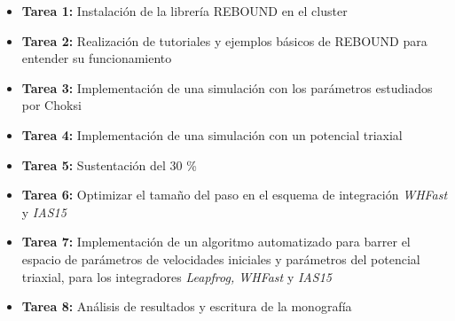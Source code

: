 	\begin{itemize}
		\item \textbf{Tarea 1:} Instalaci\'on de la librer\'ia REBOUND en el cluster
		\item \textbf{Tarea 2:} Realización de tutoriales y ejemplos básicos de REBOUND para entender su funcionamiento
		\item \textbf{Tarea 3:} Implementación de una simulación con los par\'ametros estudiados por Choksi \cite{choksi2017recoiling}
		\item \textbf{Tarea 4:} Implementaci\'on de una simulaci\'on con un potencial triaxial
		\item \textbf{Tarea 5:} Sustentaci\'on del 30 \%
		\item \textbf{Tarea 6:} Optimizar el tama\~no del paso en el esquema de integraci\'on \textit{WHFast} y \textit{IAS15}
		\item \textbf{Tarea 7:} Implementaci\'on de un algoritmo automatizado para barrer el espacio de par\'ametros de velocidades iniciales y par\'ametros del potencial triaxial, para los integradores \textit{Leapfrog, WHFast} y \textit{IAS15}
		\item \textbf{Tarea 8:} An\'alisis de resultados y escritura de la monograf\'ia
		
	\end{itemize}